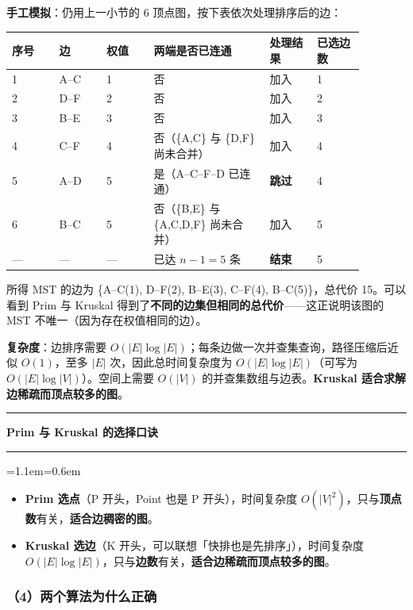 \documentclass[11pt,openany,UTF8]{ctexbook}
\newcommand{\callouthead}[2]{%
  \par\addvspace{7pt}\noindent
  {\color{#1}\rule[-0.15em]{3pt}{1.05em}}\hspace{0.5em}%
  {\bfseries\color{#1}#2}\par\nobreak\vspace{-0.35em}%
  {\color{rulesep}\hrule height 0.4pt}\nobreak\vspace{0.45em}%
  \begingroup\small\setlength{\parindent}{0pt}%
  \leftskip=1.1em\rightskip=0.6em\noindent\ignorespaces}
\newcommand{\calloutend}{\par\endgroup\addvspace{7pt}}
\newenvironment{callkey}[1]{\callouthead{keybar}{#1}}{\calloutend}
\begin{document}
\textbf{手工模拟}：仍用上一小节的 6 顶点图，按下表依次处理排序后的边：

\begingroup\small\setlength{\tabcolsep}{4.0pt}
\begin{longtable}{@{}L{0.1194\linewidth}L{0.1194\linewidth}L{0.1194\linewidth}L{0.2799\linewidth}L{0.1194\linewidth}L{0.1194\linewidth}@{}}
\toprule
\textbf{序号} & \textbf{边} & \textbf{权值} & \textbf{两端是否已连通} & \textbf{处理结果} & \textbf{已选边数} \\
\midrule
{} & A–C & 1 & 否 & 加入 & 1 \\
2 & D–F & 2 & 否 & 加入 & 2 \\
3 & B–E & 3 & 否 & 加入 & 3 \\
4 & C–F & 4 & 否（\{A,C\} 与 \{D,F\} 尚未合并） & 加入 & 4 \\
5 & A–D & 5 & 是（A–C–F–D 已连通） & \textbf{跳过} & 4 \\
6 & B–C & 5 & 否（\{B,E\} 与 \{A,C,D,F\} 尚未合并） & 加入 & 5 \\
— & — & — & 已达 $n-1=5$ 条 & \textbf{结束} & 5 \\
\bottomrule
\end{longtable}
\endgroup

所得 MST 的边为 \{A–C(1), D–F(2), B–E(3), C–F(4), B–C(5)\}，总代价 15。可以看到 Prim 与 Kruskal 得到了\textbf{不同的边集但相同的总代价}——这正说明该图的 MST 不唯一（因为存在权值相同的边）。

\textbf{复杂度}：边排序需要 $O(|E|\log|E|)$；每条边做一次并查集查询，路径压缩后近似 $O(1)$，至多 $|E|$ 次，因此总时间复杂度为 $O(|E|\log|E|)$（可写为 $O(|E|\log|V|)$）。空间上需要 $O(|V|)$ 的并查集数组与边表。\textbf{Kruskal 适合求解边稀疏而顶点较多的图}。

\begin{callkey}{Prim 与 Kruskal 的选择口诀}
\begin{itemize}
\item \textbf{Prim 选点}（P 开头，Point 也是 P 开头），时间复杂度 $O(|V|^{2})$，只与\textbf{顶点数}有关，\textbf{适合边稠密的图}。
\item \textbf{Kruskal 选边}（K 开头，可以联想「快排也是先排序」），时间复杂度 $O(|E|\log|E|)$，只与\textbf{边数}有关，\textbf{适合边稀疏而顶点较多的图}。
\end{itemize}
\end{callkey}

\subsubsection{（4）两个算法为什么正确}
\end{document}
